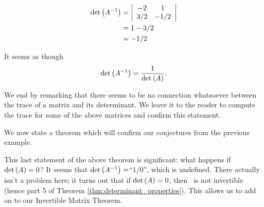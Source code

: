 {\begin{align*}
\det{\ttai} & = \bdt{cc} -2& 1\\ 3/2 & -1/2\edt\\
&=	1-3/2\\
&=-1/2
\end{align*}

It seems as though $$\det{\ttai} = \frac{1}{\det{\tta}}.$$

We end by remarking that there seems to be no connection whatsoever between the trace of a matrix and its determinant. We leave it to the reader to compute the trace for some of the above matrices and confirm this statement. \\ } %

We now state a theorem which will confirm our conjectures from the previous example. 


This last statement of the above theorem is significant: what happens if $\det{\tta} = 0$? It seems that $\det{\ttai} = $``$1/0$'', which is undefined. There actually isn't a problem here; it turns out that if $\det{\tta}=0$, then \tta\ is not invertible (hence part 5 of Theorem \ref{thm:determinant_properties}). This allows us to add on to our Invertible Matrix Theorem.


